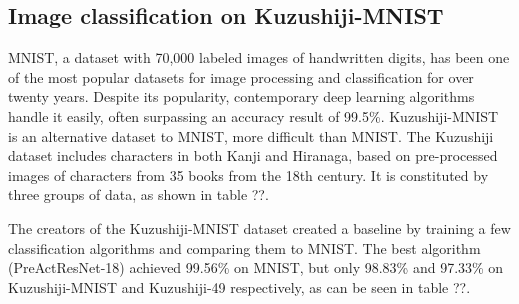 \subsection{Image classification on Kuzushiji-MNIST}
\label{ssec:imagemnist}

MNIST, a dataset with 70,000 labeled images of handwritten digits, has been one of the most popular datasets for image processing and classification for over twenty years. Despite its popularity, contemporary deep learning algorithms handle it easily, often surpassing an accuracy result of 99.5\%. Kuzushiji-MNIST is an alternative dataset to MNIST, more difficult than MNIST. The Kuzushiji dataset includes characters in both Kanji and Hiranaga, based on pre-processed images of characters from 35 books from the 18th century. It is constituted by three groups of data, as shown in table ??.

The creators of the Kuzushiji-MNIST dataset created a baseline by training a few classification algorithms and comparing them to MNIST. The best algorithm (PreActResNet-18) achieved 99.56\% on MNIST, but only 98.83\% and 97.33\% on Kuzushiji-MNIST and Kuzushiji-49 respectively, as can be seen in table ??.

